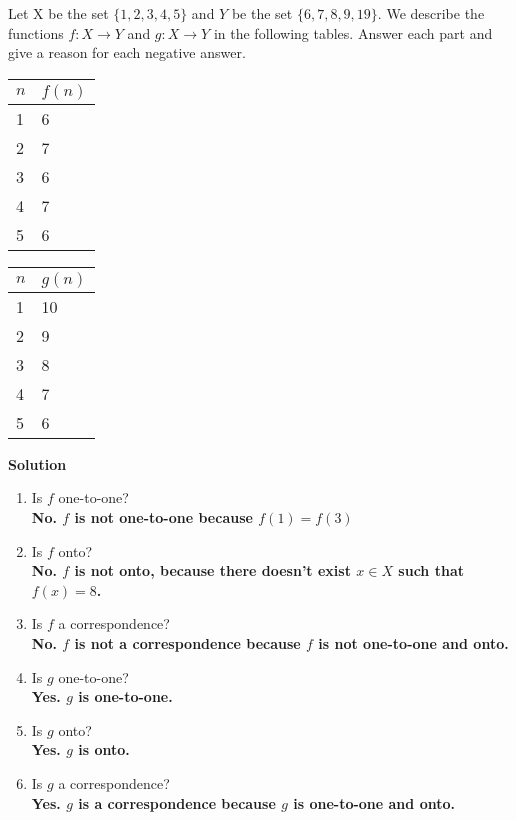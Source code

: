 \documentclass{article}
\newcommand\curl[1]{\{#1\}}
\begin{document}
    Let X be the set $\curl{1,2,3,4,5}$ and $Y$ be the set $\curl{6,7,8,9,19}$. We describe the functions $ f : X \rightarrow Y$ and $g: X \rightarrow Y$
    in the following tables. Answer each part and give a reason for each negative answer.

    \begin{table}[h!]
    \centering
    \begin{tabular}{l|l}
     $n$   & $f(n)$  \\ \hline
     1     & 6 \\
     2     & 7 \\
     3     & 6 \\
     4     & 7 \\
     5     & 6 
    \end{tabular}
    \quad
    \begin{tabular}{l|l}
     $n$& $g(n)$  \\ \hline
     1  & 10 \\
     2  & 9 \\
     3  & 8 \\
     4  & 7 \\
     5  & 6
    \end{tabular}
    \end{table}
    
    \textbf{Solution}

    \begin{enumerate}[1., leftmargin = 0.6cm]
    \itemsep0em
    \item Is $f$ one-to-one?\\
        \textbf{No. $f$ is not one-to-one because $f(1) = f(3)$}
    \item Is $f$ onto?\\
        \textbf{No. $f$ is not onto, because there doesn't exist $x \in X$ such that $f(x) = 8$.}
    \item Is $f$ a correspondence?\\
        \textbf{No. $f$ is not a correspondence because $f$ is not one-to-one and onto.}
    \item Is $g$ one-to-one? \\
        \textbf{Yes. $g$ is one-to-one.}
    \item Is $g$ onto?\\
        \textbf{Yes. $g$ is onto.}
    \item Is $g$ a correspondence?\\
        \textbf{Yes. $g$ is a correspondence because $g$ is one-to-one and onto.}
    \end{enumerate}
\end{document}
